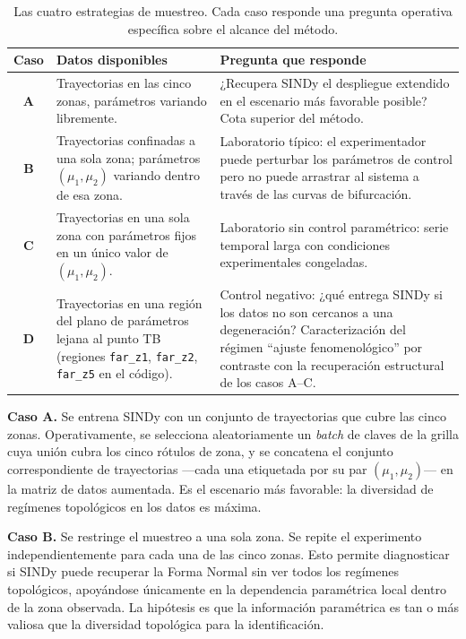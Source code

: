 \begin{table}[h]
\centering
\small
\begin{tabular}{c|p{4.2cm}|p{6.5cm}}
\hline
Caso & Datos disponibles & Pregunta que responde \\
\hline
\textbf{A} & Trayectorias en las cinco zonas, parámetros variando libremente. & ¿Recupera SINDy el despliegue extendido en el escenario más favorable posible? Cota superior del método. \\
\hline
\textbf{B} & Trayectorias confinadas a una sola zona; parámetros $(\mu_1,\mu_2)$ variando dentro de esa zona. & Laboratorio típico: el experimentador puede perturbar los parámetros de control pero no puede arrastrar al sistema a través de las curvas de bifurcación. \\
\hline
\textbf{C} & Trayectorias en una sola zona con parámetros fijos en un único valor de $(\mu_1, \mu_2)$. & Laboratorio sin control paramétrico: serie temporal larga con condiciones experimentales congeladas. \\
\hline
\textbf{D} & Trayectorias en una región del plano de parámetros lejana al punto TB (regiones \texttt{far\_z1}, \texttt{far\_z2}, \texttt{far\_z5} en el código). & Control negativo: ¿qué entrega SINDy si los datos no son cercanos a una degeneración? Caracterización del régimen \enquote{ajuste fenomenológico} por contraste con la recuperación estructural de los casos A--C. \\
\hline
\end{tabular}
\caption{Las cuatro estrategias de muestreo. Cada caso responde una pregunta operativa específica sobre el alcance del método.}
\label{tab:casos}
\end{table}

\textbf{Caso A.} Se entrena SINDy con un conjunto de trayectorias que cubre las cinco zonas. Operativamente, se selecciona aleatoriamente un \textit{batch} de claves de la grilla cuya unión cubra los cinco rótulos de zona, y se concatena el conjunto correspondiente de trayectorias —cada una etiquetada por su par $(\mu_1, \mu_2)$— en la matriz de datos aumentada. Es el escenario más favorable: la diversidad de regímenes topológicos en los datos es máxima.

\textbf{Caso B.} Se restringe el muestreo a una sola zona. Se repite el experimento independientemente para cada una de las cinco zonas. Esto permite diagnosticar si SINDy puede recuperar la Forma Normal sin ver todos los regímenes topológicos, apoyándose únicamente en la dependencia paramétrica local dentro de la zona observada. La hipótesis es que la información paramétrica es tan o más valiosa que la diversidad topológica para la identificación.

